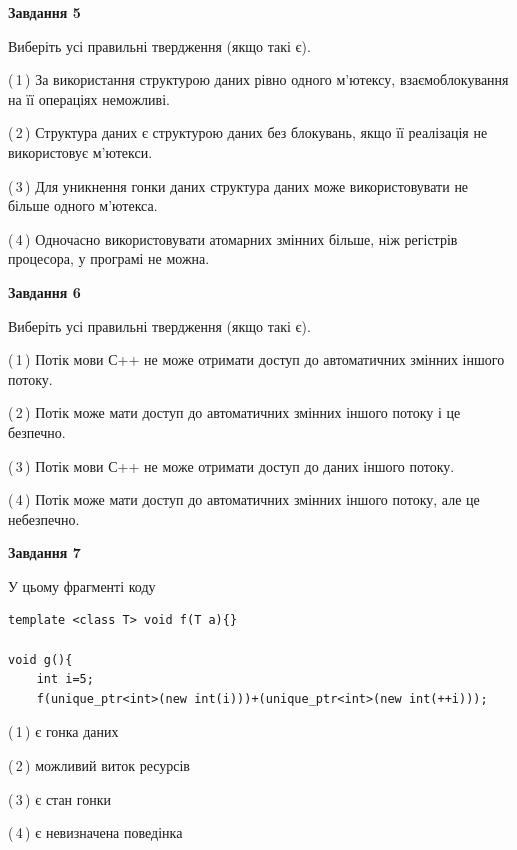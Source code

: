 \documentclass[12pt, ukrainian]{article}
\begin{document}
\begin {large}
{\begin{center}
\textbf{Завдання 5}
\end{center}

Виберіть усі правильні твердження (якщо такі є).\par
\vspace{2mm}

(\,1\,) За використання структурою даних рівно одного м’ютексу, взаємоблокування на її операціях неможливі.%

(\,2\,) Структура даних є структурою даних без блокувань, якщо її реалізація не використовує м’ютекси.%

(\,3\,) Для уникнення гонки даних структура даних може використовувати не більше одного м’ютекса.%

(\,4\,) Одночасно використовувати атомарних змінних більше, ніж регістрів процесора, у програмі не можна.%
\newpage


\begin{center}
\textbf{Завдання 6}
\end{center}

Виберіть усі правильні твердження (якщо такі є).\par
\vspace{2mm}

(\,1\,) Потік мови С++ не може отримати доступ до автоматичних змінних іншого потоку.%

(\,2\,) Потік може мати доступ до автоматичних змінних іншого потоку і це безпечно.%

(\,3\,) Потік мови С++ не може отримати доступ до даних іншого потоку.%

(\,4\,) Потік може мати доступ до автоматичних змінних іншого потоку, але це небезпечно.%


\begin{center}
\textbf{Завдання 7}
\end{center}

У цьому фрагменті коду
\begin{verbatim}
template <class T> void f(T a){}

void g(){
    int i=5;
    f(unique_ptr<int>(new int(i)))+(unique_ptr<int>(new int(++i)));
\end{verbatim}
(\,1\,) є гонка даних%

(\,2\,) можливий виток ресурсів%

(\,3\,) є стан гонки%

(\,4\,) є невизначена поведінка%

}
\end {large}

\vspace{4mm}
\newpage
\end{document}
